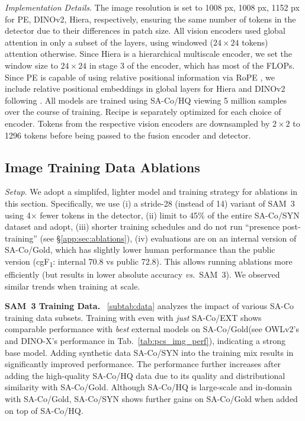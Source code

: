 \documentclass[]{fairmeta}
\newcommand{\model}{SAM~3\xspace}
\newcommand{\dsname}{{SA-Co}\xspace}
\newcommand{\trainhq}{{\dsname/HQ}\xspace}
\newcommand{\trainsyn}{{\dsname/SYN}\xspace}
\newcommand{\trainext}{{\dsname/EXT}\xspace}
\newcommand{\evalgold}{{\dsname/Gold}\xspace}
\newcommand{\cgf}{cgF\textsubscript{1}\xspace}
\renewcommand{\paragraph}[1]{%
	\noindent\textbf{#1.}\noindent\xspace%
}
\begin{document}
\textit{Implementation Details}. The image resolution is set to 1008 px, 1008 px, 1152 px for PE, DINOv2, Hiera, respectively, ensuring the same number of tokens in the detector due to their differences in patch size. All vision encoders used global attention in only a subset of the layers, using windowed ($24\times24$ tokens) attention otherwise. Since Hiera is a hierarchical multiscale encoder, we set the window size to $24\times24$ in stage 3 of the encoder, which has most of the FLOPs. Since PE is capable of using relative positional information via RoPE \citep{roformer,heo2024rotarypositionembeddingvision}, we include relative positional embeddings in global layers for Hiera and DINOv2 following \cite{abswin}. All models are trained using \trainhq viewing 5 million samples over the course of training. Recipe is separately optimized for each choice of encoder. Tokens from the respective vision encoders are downsampled by $2\times2$ to 1296 tokens before being passed to the fusion encoder and detector.

\subsection{Image Training Data Ablations}
\label{sec:img_data_ablation}

\textit{Setup}. We adopt a simplifed, lighter model and training strategy for ablations in this section. Specifically, we use (i) a stride-28 (instead of 14) variant of \model using 4$\times$ fewer tokens in the detector, (ii) limit to 45\% of the entire \trainsyn dataset and adopt, (iii) shorter training schedules and do not run ``presence post-training'' (see \S\ref{app:sec:ablations}), (iv) evaluations are on an internal version of \evalgold, which has slightly lower human performance than the public version (\cgf: internal 70.8 vs public 72.8). This allows running ablations more efficiently (but results in lower absolute accuracy \textit{vs.}~\model). We observed similar trends when training at scale.

\paragraph{\model Training Data} ~\cref{subtab:data} analyzes the impact of various \dsname training data subsets. Training with even with \textit{just} \trainext shows comparable performance with \textit{best} external models on \evalgold (see OWLv2's and DINO-X's performance in Tab.~\ref{tab:pcs_img_perf}), indicating a strong base model. Adding synthetic data \trainsyn into the training mix results in significantly improved performance. The performance further increases after adding the high-quality \trainhq data due to its quality and distributional similarity with \evalgold. Although \trainhq is large-scale and in-domain with \evalgold, \trainsyn shows further gains on \evalgold when added on top of \trainhq.
\end{document}
